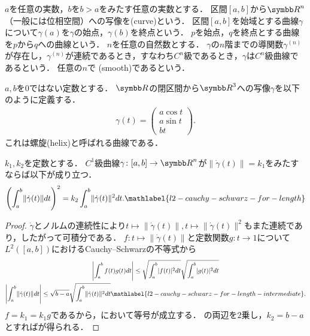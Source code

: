 \documentclass{ltjsbook}
\begin{document}

\(a\)を任意の実数，\(b\)を\(b > a\)をみたす任意の実数とする．
区間\([a, b]\)から\({\Real}^n\)（一般には位相空間）への写像を(curve)という．
区間\([a, b]\)を始域とする曲線\(\gamma\)について\(\gamma(a)\)を\(\gamma\)の始点，\(\gamma(b)\)を終点という．
\(p\)を始点，\(q\)を終点とする曲線を\(p\)から\(q\)への曲線という．
\(n\)を任意の自然数とする．
\(\gamma\)の\(n\)階までの導関数\(\gamma^{(n)}\)が存在し，\(\gamma^{(n)}\)が連続であるとき，すなわち\(C^n\)級であるとき，\(\gamma\)は\(C^n\)級曲線であるという．
任意の\(n\)で
(smooth)であるという．

\begin{example} \(a, b\)を\(0\)ではない定数とする．
\({\Real}\)の閉区間から\({\Real}^3\)への写像\(\gamma\)を以下のように定義する．
\begin{align*}
    \gamma(t) = \begin{pmatrix}
        a \cos t \\
        a \sin t \\
        b t
    \end{pmatrix}.
\end{align*}
これは螺旋(helix)と呼ばれる曲線である．
\end{example}

\begin{thmbox}
\begin{proposition}
\(k_1, k_2\)を定数とする．
\(C^1\)級曲線\(\gamma \colon [a, b] \to {\Real}^n\)が\(\lVert \dot{\gamma}(t) \rVert = k_1\)をみたすならば以下が成り立つ．
\begin{align}
    \left(\int_a^b \lVert \dot{\gamma}(t) \rVert dt \right)^2
    = k_2 \int_a^b \lVert \dot{\gamma}(t) \rVert^2 dt.
    \mathlabel{l2-cauchy-schwarz-for-length}
\end{align}
\end{proposition}
\end{thmbox}

\begin{proof} \(\dot{\gamma}\)とノルムの連続性により\(t \mapsto \lVert \dot{\gamma}(t) \rVert, t \mapsto \lVert \dot{\gamma}(t) \rVert^2\)もまた連続であり，したがって可積分である．
\(f\colon t \mapsto \lVert \dot{\gamma}(t) \rVert\)と定数関数\(g \colon t \to 1\)について\(L^2([a, b])\)におけるCauchy--Schwarzの不等式から
\begin{gather}
    \left\lvert \int_a^b f(t) g(t) dt \right\rvert \leq \sqrt{\int_a^b \lvert f(t) \rvert^2 dt} \sqrt{\int_a^b \lvert g(t) \rvert^2 dt} \notag \\
    \left\lvert \int_a^b \lVert \dot{\gamma}(t) \rVert dt \right\rvert \leq \sqrt{b - a} \sqrt{\int_a^b \lVert \dot{\gamma}(t) \rVert^2 dt} \mathlabel{l2-cauchy-schwarz-for-length-intermediate}.
\end{gather}
\(f = k_1 = k_1 g\)であるから，において等号が成立する．
の両辺を\(2\)乗し，\(k_2 = b - a\)とすればが得られる．
\end{proof}
\end{document}
